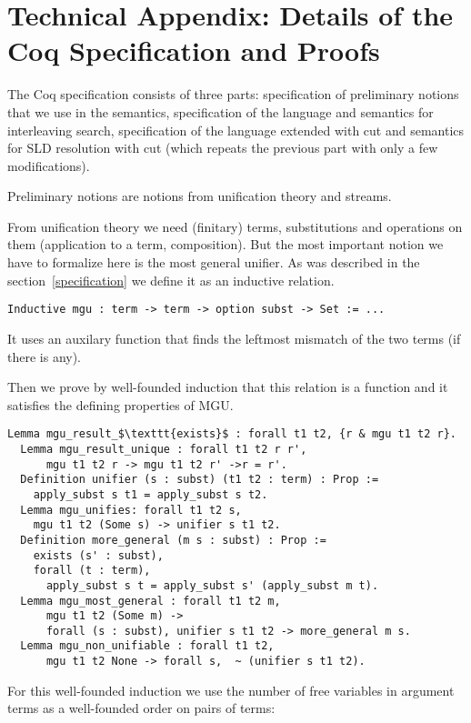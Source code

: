 \section{Technical Appendix: Details of the Coq Specification and Proofs}
\label{appendix}

The Coq specification consists of three parts: specification of preliminary notions that we use in the semantics, specification of the language and semantics for interleaving search, specification of the language extended with cut and semantics for SLD resolution with cut (which repeats the previous part with only a few modifications).

Preliminary notions are notions from unification theory and streams.

From unification theory we need (finitary) terms, substitutions and operations on them (application to a term, composition). But the most important notion we have to formalize here is the most general unifier. As was described in the section~\ref{specification} we define it as an inductive relation.

\begin{lstlisting}[language=Coq]
  Inductive mgu : term -> term -> option subst -> Set := ...
\end{lstlisting}

It uses an auxilary function that finds the leftmost mismatch of the two terms (if there is any).

Then we prove by well-founded induction that this relation is a function and it satisfies the defining properties of MGU.

\begin{lstlisting}[language=Coq]
  Lemma mgu_result_$\texttt{exists}$ : forall t1 t2, {r & mgu t1 t2 r}.
  Lemma mgu_result_unique : forall t1 t2 r r',
      mgu t1 t2 r -> mgu t1 t2 r' ->r = r'.
  Definition unifier (s : subst) (t1 t2 : term) : Prop :=
    apply_subst s t1 = apply_subst s t2.
  Lemma mgu_unifies: forall t1 t2 s,
    mgu t1 t2 (Some s) -> unifier s t1 t2.
  Definition more_general (m s : subst) : Prop :=
    exists (s' : subst),
    forall (t : term),
      apply_subst s t = apply_subst s' (apply_subst m t).
  Lemma mgu_most_general : forall t1 t2 m,
      mgu t1 t2 (Some m) ->
      forall (s : subst), unifier s t1 t2 -> more_general m s.
  Lemma mgu_non_unifiable : forall t1 t2,
      mgu t1 t2 None -> forall s,  ~ (unifier s t1 t2).
\end{lstlisting}

For this well-founded induction we use the number of free variables in argument terms as a well-founded order on pairs of terms:

